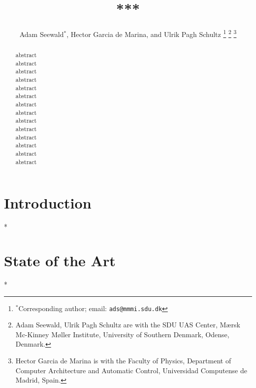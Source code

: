 \documentclass[letterpaper,10pt,conference]{ieeeconf}
\title{\LARGE \bf
***
}
\author{
  Adam Seewald$^{*}$, Hector Garcia de Marina, and Ulrik Pagh Schultz
  \thanks{$^{*}$Corresponding author; email: {\tt\small ads@mmmi.sdu.dk}}
  \thanks{Adam Seewald, Ulrik Pagh Schultz are with the SDU UAS Center, M{\ae}rsk Mc-Kinney M{\o}ller Institute, University of Southern Denmark, Odense, Denmark.}
  \thanks{Hector Garcia de Marina is with the Faculty of Physics, Department of Computer Architecture and Automatic Control, Universidad Computense de Madrid, Spain.}
}
\begin{document}
\maketitle

\thispagestyle{empty}
\pagestyle{empty}

\begin{abstract}

  abstract\\
  abstract\\
  abstract\\
  abstract\\
  abstract\\
  abstract\\
  abstract\\
  abstract\\
  abstract\\
  abstract\\
  abstract\\
  abstract\\
  abstract\\
  abstract
\end{abstract}

%
\IEEEpeerreviewmaketitle

\section{Introduction}

*

\section{State of the Art}
\label{sec:related}

*
\end{document}
